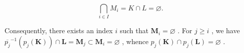\[
\bigcap_ {i \in I} M _ {i} = K \cap L = \varnothing .
\]

Consequently, there exists an index \(i\) such that \(\mathbf{M}_i = \varnothing\) . For \(j \geqslant i\) , we have \(\overline{p_j}^{-1} (p_j(\mathbf{K})) \cap \mathbf{L} = \mathbf{M}_j \subset \mathbf{M}_i = \varnothing\) , whence \(p_j(\mathbf{K}) \cap p_j(\mathbf{L}) = \varnothing\) .
\relax{}
